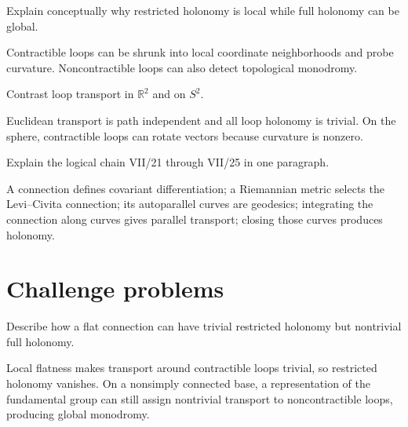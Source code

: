 \begin{problem}\label{prob:vii25-10}
Explain conceptually why restricted holonomy is local while full holonomy can be global.
\end{problem}
\begin{solution}
Contractible loops can be shrunk into local coordinate neighborhoods and probe curvature. Noncontractible loops can also detect topological monodromy.
\end{solution}


\begin{problem}\label{prob:vii25-11}
Contrast loop transport in \(\mathbb R^2\) and on \(S^2\).
\end{problem}
\begin{solution}
Euclidean transport is path independent and all loop holonomy is trivial. On the sphere, contractible loops can rotate vectors because curvature is nonzero.
\end{solution}


\begin{problem}\label{prob:vii25-12}
Explain the logical chain VII/21 through VII/25 in one paragraph.
\end{problem}
\begin{solution}
A connection defines covariant differentiation; a Riemannian metric selects the Levi--Civita connection; its autoparallel curves are geodesics; integrating the connection along curves gives parallel transport; closing those curves produces holonomy.
\end{solution}

\section{Challenge problems}

\begin{problem}\label{prob:vii25-ch01}
Describe how a flat connection can have trivial restricted holonomy but nontrivial full holonomy.
\end{problem}
\begin{solution}
Local flatness makes transport around contractible loops trivial, so restricted holonomy vanishes. On a nonsimply connected base, a representation of the fundamental group can still assign nontrivial transport to noncontractible loops, producing global monodromy.
\end{solution}


